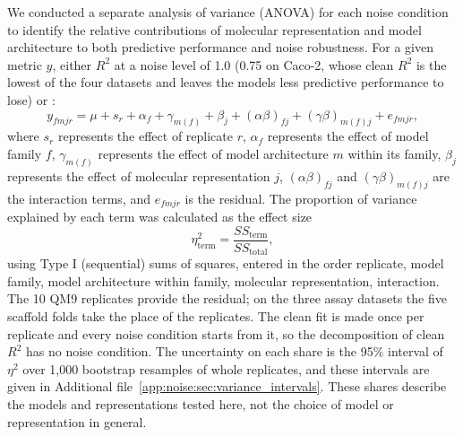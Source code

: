 We conducted a separate analysis of variance (ANOVA) for each noise condition to identify the
relative contributions of molecular representation and model architecture to both predictive
performance and noise robustness. For a given metric $y$, either $R^2$ at a noise level of 1.0 (0.75 on Caco-2, whose clean $R^2$ is the lowest of the four datasets and leaves the models less predictive performance to lose) or
\aucnorm:
\begin{equation}
y_{fmjr} = \mu + s_r + \alpha_f + \gamma_{m(f)} + \beta_j + (\alpha\beta)_{fj} + (\gamma\beta)_{m(f)j} + e_{fmjr},
\end{equation}
where $s_r$ represents the effect of replicate $r$, $\alpha_f$ represents the effect of model family $f$, $\gamma_{m(f)}$ represents the effect of model architecture $m$ within its family, $\beta_j$ represents the effect of
molecular representation $j$, $(\alpha\beta)_{fj}$ and $(\gamma\beta)_{m(f)j}$ are the interaction terms, and $e_{fmjr}$ is the
residual. The proportion of variance explained by each term was calculated as the
effect size
\begin{equation}
\eta^2_{\text{term}} = \frac{SS_{\text{term}}}{SS_{\text{total}}},
\end{equation}
using Type I (sequential) sums of squares, entered in the order replicate, model family, model architecture within family, molecular
representation, interaction. The 10 QM9 replicates provide the residual; on the three assay datasets the five scaffold folds take the place of the replicates. The clean fit is made once per replicate and every noise condition starts from it, so the decomposition of clean $R^2$ has no noise condition. The uncertainty on each share is the 95\% interval of $\eta^2$ over 1,000 bootstrap resamples of whole replicates, and these intervals are given in Additional file~\ref{app:noise:sec:variance_intervals}. These shares describe the models and representations tested here, not the choice of model or representation in general. 

